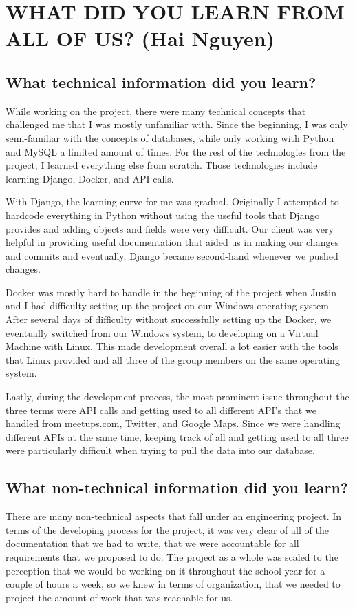 \documentclass[draftclsnofoot,10pt,onecolumn]{IEEEtran} %
\begin{document}
\section{WHAT DID YOU LEARN FROM ALL OF US? (Hai Nguyen)}

\subsection{What technical information did you learn?}
While working on the project, there were many technical concepts that challenged
me that I was mostly unfamiliar with. Since the beginning, I was only
semi-familiar with the concepts of databases, while only working with Python and
MySQL a limited amount of times. For the rest of the technologies from the
project, I learned everything else from scratch. Those technologies include
learning Django, Docker, and API calls. 

With Django, the learning curve for me was gradual. Originally I attempted to
hardcode everything in Python without using the useful tools that Django
provides and adding objects and fields were very difficult. Our client was very
helpful in providing useful documentation that aided us in making our changes
and commits and eventually, Django became second-hand whenever we pushed
changes. 

Docker was mostly hard to handle in the beginning of the project when Justin and
I had difficulty setting up the project on our Windows operating system. After
several days of difficulty without successfully setting up the Docker, we
eventually switched from our Windows system, to developing on a Virtual Machine
with Linux. This made development overall a lot easier with the tools that Linux
provided and all three of the group members on the same operating system.

Lastly, during the development process, the most prominent issue throughout the
three terms were API calls and getting used to all different API’s that we
handled from meetups.com, Twitter, and Google Maps. Since we were handling
different APIs at the same time, keeping track of all and getting used to all
three were particularly difficult when trying to pull the data into our
database.

\subsection{What non-technical information did you learn?}
There are many non-technical aspects that fall under an engineering project. In
terms of the developing process for the project, it was very clear of all of the
documentation that we had to write, that we were accountable for all
requirements that we proposed to do. The project as a whole was scaled to the
perception that we would be working on it throughout the school year for a
couple of hours a week, so we knew in terms of organization, that we needed to
project the amount of work that was reachable for us. 
\end{document}
